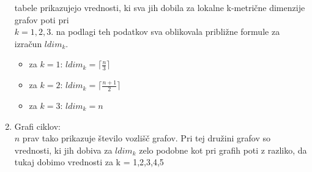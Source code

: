 \documentclass[12pt,a4paper]{amsart}
\theoremstyle{plain} %
\begin{document}
\begin{enumerate}
tabele prikazujejo vrednosti, ki sva jih dobila za lokalne k-metrične dimenzije grafov poti pri \\ $k = 1, 2, 3$. na podlagi teh podatkov sva oblikovala približne formule za izračun $ldim_k$. \\

\begin{itemize}
    \item za $k=1$: $ldim_k= \lceil \frac{n}{3} \rceil$ 
    \item za $k = 2$: $ ldim_k= \lceil \frac{n+1}{2} \rceil $
    \item za $k= 3$: $ ldim_k= n $
\end{itemize}

\newpage

\item Grafi ciklov: \\
  $n$ prav tako prikazuje število vozlišč grafov. Pri tej družini grafov so vrednosti, ki jih dobiva za $ldim_k$ zelo podobne kot pri grafih poti z razliko, da tukaj dobimo vrednosti za k = 1,2,3,4,5


\end{enumerate}
\end{document}
